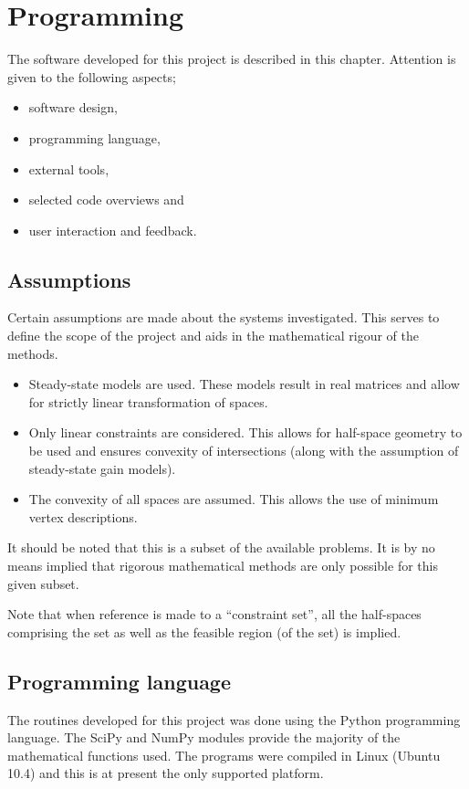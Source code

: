 \chapter{Programming}\label{chap:prog}
\begin{overview}
  The software developed for this project is described in this chapter.
  Attention is given to the following aspects;
  \begin{itemize}
    \item software design,
    \item programming language,
    \item external tools,
    \item selected code overviews and
    \item user interaction and feedback.
  \end{itemize}
\end{overview}

\section{Assumptions}
Certain assumptions are made about the systems investigated.
This serves to define the scope of the project and aids in the mathematical rigour of the methods.
\begin{itemize}
\item Steady-state models are used.
  These models result in real matrices and allow for strictly linear transformation of spaces.
\item Only linear constraints are considered.
  This allows for half-space geometry to be used and ensures convexity of intersections (along with the assumption of steady-state gain models).
\item The convexity of all spaces are assumed.
  This allows the use of minimum vertex descriptions.
\end{itemize}
It should be noted that this is a subset of the available problems.
It is by no means implied that rigorous mathematical methods are only possible for this given subset.

Note that when reference is made to a ``constraint set'', all the half-spaces comprising the set as well as the feasible region (of the set) is implied.

\section{Programming language}
The routines developed for this project was done using the Python programming language.
The SciPy and NumPy modules provide the majority of the mathematical functions used.
The programs were compiled in Linux (Ubuntu 10.4) and this is at present the only supported platform.

